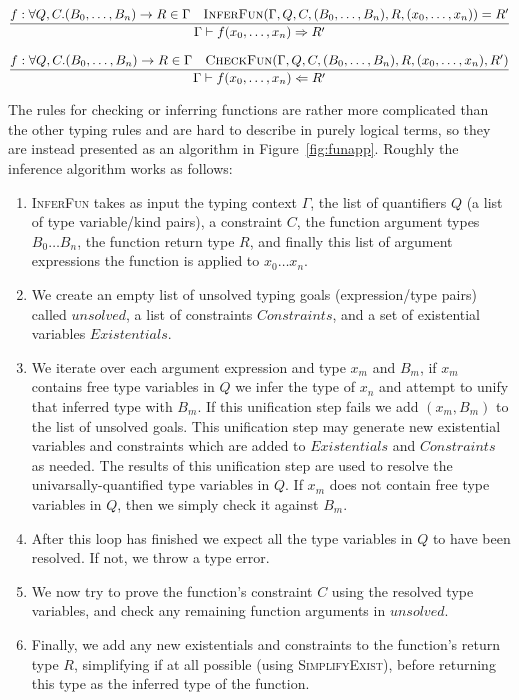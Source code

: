 \begin{align*}
  \frac{
    f : \forall Q, C.(B_0,\ldots,B_n) \rightarrow R \in \Gamma
    \quad \textsc{InferFun}(\Gamma,Q,C,(B_0,\ldots,B_n),R,(x_0,\ldots,x_n)) = R'
  } {
    \Gamma \vdash f(x_0, \ldots, x_n) \Rightarrow R'
  }
\end{align*}

\begin{align*}
  \frac{
    f : \forall Q, C.(B_0,\ldots,B_n) \rightarrow R \in \Gamma
    \quad \textsc{CheckFun}(\Gamma,Q,C,(B_0,\ldots,B_n),R,(x_0,\ldots,x_n),R')
  } {
    \Gamma \vdash f(x_0, \ldots, x_n) \Leftarrow R'
  }
\end{align*}

The rules for checking or inferring functions are rather more
complicated than the other typing rules and are hard to describe in
purely logical terms, so they are instead presented as an algorithm in
Figure~\ref{fig:funapp}. Roughly the inference algorithm works as
follows:

\begin{enumerate}
\item \textsc{InferFun} takes as input the typing context $\Gamma$, the
  list of quantifiers $Q$ (a list of type variable/kind pairs), a
  constraint $C$, the function argument types $B_0\ldots B_n$, the
  function return type $R$, and finally this list of argument
  expressions the function is applied to $x_0\ldots x_n$.

\item We create an empty list of unsolved typing goals
  (expression/type pairs) called $\mathit{unsolved}$, a list of
  constraints $\mathit{Constraints}$, and a set of existential
  variables $\mathit{Existentials}$.

\item We iterate over each argument expression and type $x_m$ and
  $B_m$, if $x_m$ contains free type variables in $Q$ we infer the
  type of $x_n$ and attempt to unify that inferred type with $B_m$. If
  this unification step fails we add $(x_m, B_m)$ to the list of
  unsolved goals. This unification step may generate new existential
  variables and constraints which are added to $\mathit{Existentials}$
  and $\mathit{Constraints}$ as needed. The results of this
  unification step are used to resolve the univarsally-quantified type
  variables in $Q$. If $x_m$ does not contain free type variables in
  $Q$, then we simply check it against $B_m$.

\item After this loop has finished we expect all the type variables in
  $Q$ to have been resolved. If not, we throw a type error.

\item We now try to prove the function's constraint $C$ using the
  resolved type variables, and check any remaining function arguments
  in $\mathit{unsolved}$.

\item Finally, we add any new existentials and constraints to the
  function's return type $R$, simplifying if at all possible (using
  \textsc{SimplifyExist}), before returning this type as the inferred
  type of the function.
\end{enumerate}

